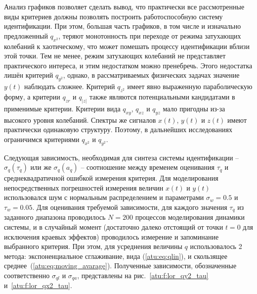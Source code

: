Анализ графиков позволяет сделать вывод, что практически все
рассмотренные виды критериев должны позволять построить
работоспособную систему идентификации. При этом,
большая часть графиков, в том числе и изначально
предложенный $q_{x^2}$, теряют монотонность
при переходе от режима затухающих колебаний к хаотическому,
что может помешать процессу идентификации вблизи этой точки.
Тем не менее, режим затухающих колебаний не представляет
практического интереса, и этим недостатком можно пренебречь.
Этого недостатка лишён критерий $q_{y^2}$, однако,
в рассматриваемых физических задачах значение
$y(t)$ наблюдать сложнее.
Критерий $q_{z^2}$ имеет явно выраженную параболическую форму,
а критерии $q_{zr}$ и $q_{|z|}$ также являются потенциальными кандидатами
в применимые критерии.
Критерии вида $q_{xy}$, $q_{xz}$ и $q_{yz}$
мало пригодны из-за высокого уровня колебаний.
Спектры же сигналов $x(t)$, $y(t)$ и $z(t)$
имеют практически одинаковую структуру.
Поэтому, в дальнейших исследованиях ограничимся
критериями
$q_{x^2}$ и
$q_{y^2}$.

Следующая зависимость, необходимая для синтеза
системы идентификации -- $ \sigma_q(\tau_q) $
или же  $ \sigma_q(a_q) $ -- соотношение между
временем оценивания $\tau_q$ и среднеквадратичной
ошибкой измерения критерия.
Для моделирования непосредственных погрешностей измерения величин
$x(t)$ и $y(t)$ использовался шум с нормальным распределением
и параметрами $\sigma_w=0.5$ и $\tau_w=0.05$.
Для оценивания требуемой зависимости, для каждого
значения $\tau_q$ из заданного диапазона
проводилось $N=200$ процессов моделирования динамики системы,
и в случайный момент (достаточно далеко отстоящий от точки $t=0$ для исключения краевых эффектов)
проводилось измерение и запоминание выбранного критерия.
При этом, для усреднения величины $q$ использовалось 2 метода:
экспоненциальное сглаживание, вида (\ref{atu:eq:qlin}), и скользящее среднее~(\ref{atu:eq:moving_avarage}).
Полученные зависимости, обозначенные соответственно
$\sigma_{ql}$ и $\sigma_{qa}$, представлены на
рис.~\ref{atu:f:lor_qy2_tau} и~\ref{atu:f:lor_qx2_tau}.


